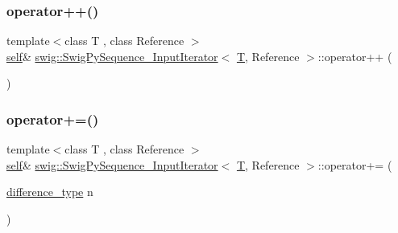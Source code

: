 \mbox{\label{structswig_1_1_swig_py_sequence___input_iterator_a70faeb674de65e5462b734b86e581cd6}} 
\subsubsection{\texorpdfstring{operator++()}{operator++()}}
{\footnotesize\ttfamily template$<$class T , class Reference $>$ \\
\hyperlink{structswig_1_1_swig_py_sequence___input_iterator_a3d3f028d1d9af412c61de2b5d8630321}{self}\& \hyperlink{structswig_1_1_swig_py_sequence___input_iterator}{swig\+::\+Swig\+Py\+Sequence\+\_\+\+Input\+Iterator}$<$ \hyperlink{fmt_8h_a0acb682b8260ab1c60b918599864e2e5}{T}, Reference $>$\+::operator++ (\begin{DoxyParamCaption}{ }\end{DoxyParamCaption})\hspace{0.3cm}{\ttfamily [inline]}}

\mbox{\label{structswig_1_1_swig_py_sequence___input_iterator_abff285d61554d58f95218ed8b58fb2e8}} 
\subsubsection{\texorpdfstring{operator+=()}{operator+=()}}
{\footnotesize\ttfamily template$<$class T , class Reference $>$ \\
\hyperlink{structswig_1_1_swig_py_sequence___input_iterator_a3d3f028d1d9af412c61de2b5d8630321}{self}\& \hyperlink{structswig_1_1_swig_py_sequence___input_iterator}{swig\+::\+Swig\+Py\+Sequence\+\_\+\+Input\+Iterator}$<$ \hyperlink{fmt_8h_a0acb682b8260ab1c60b918599864e2e5}{T}, Reference $>$\+::operator+= (\begin{DoxyParamCaption}\item[{\hyperlink{structswig_1_1_swig_py_sequence___input_iterator_af5e5d3f2d1906ceaf05c2215ee388096}{difference\+\_\+type}}]{n }\end{DoxyParamCaption})\hspace{0.3cm}{\ttfamily [inline]}}

